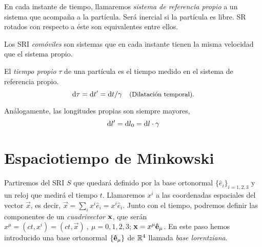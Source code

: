 \begin{define}
    En cada instante de tiempo, llamaremos \emph{sistema de referencia propio} a un sistema que acompaña a la partícula. Será inercial si la partícula es libre. SR rotados con respecto a éste son equivalentes entre ellos.
\end{define}

\begin{define}
    Los SRI \emph{comóviles} son sistemas que en cada instante tienen la misma velocidad que el sistema propio.
\end{define}

\begin{define}
    El \emph{tiempo propio} $\tau$ de una partícula es el tiempo medido en el sistema de referencia propio. 
    \begin{equation}
        \D{\tau} = \D{t'} = \D{t}/\gamma  \quad \text{\small (Dilatación temporal).}
    \end{equation}
\end{define}
Análogamente, las longitudes propias son siempre mayores, 
$$
\D{l}' = \D{l_0} = \D{l} \cdot \gamma
$$

\section{Espaciotiempo de Minkowski}
Partiremos del SRI $S$ que quedará definido por la base ortonormal $\{ \hat{e}_i \}_{i=1,2,3}$ y un reloj que medirá el tiempo $t$. Llamaremos $x^i$ a las coordenadas espaciales del vector $\vec{x}$, es decir, $\vec{x}=\sum_i x^i \hat{e}_i = x^i \hat{e}_i$. Junto con el tiempo, podremos definir las componentes de un \emph{cuadrivector} $\mathbf{x}$, que serán $x^\mu = (ct, x^i ) = (ct,\vec{x})\ , \ \mu=0,1,2,3$; $\mathbf{x} = x^\mu \mathbf{\hat{e}}_\mu $. En este paso hemos introducido una base ortonormal $\{ \mathbf{\hat{e}}_\mu \}$ de $\mathbb{R}^4$ llamada \emph{base lorentziana}. \\

